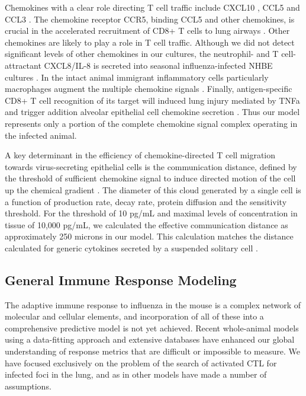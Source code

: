 \documentclass[10pt]{article}
\begin{document}
Chemokines with a clear role directing T cell traffic include CXCL10 \cite{Dufour2002}, CCL5 \cite{Kawai1999} and CCL3 \cite{Kawai1999}.  The chemokine receptor CCR5, binding CCL5 and other chemokines, is crucial in the accelerated recruitment of CD8+ T cells to lung airways \cite{Kohlmeier2008}.  Other chemokines are likely to play a role in T cell traffic.  Although we did not detect significant levels of other chemokines in our cultures, the neutrophil- and T cell-attractant CXCL8/IL-8 is secreted into seasonal influenza-infected NHBE cultures \cite{Matsukura1996, Arndt2002}.  In the intact animal immigrant inflammatory cells particularly macrophages augment the multiple chemokine signals \cite{Julkunen2000}.  Finally, antigen-specific CD8+ T cell recognition of its target will induced lung injury mediated by TNFa and trigger addition alveolar epithelial cell chemokine secretion \cite{Zhao2000}.   Thus our model represents only a portion of the complete chemokine signal complex operating in the infected animal.

A key determinant in the efficiency of chemokine-directed T cell migration towards virus-secreting epithelial cells is the communication distance, defined by the threshold of sufficient chemokine signal to induce directed motion of the cell up the chemical gradient \cite{Thelen2008}.  The diameter of this cloud generated by a single cell is a function of production rate, decay rate, protein diffusion and the sensitivity threshold.  For the threshold of 10 pg/mL and maximal levels of concentration in tissue of 10,000 pg/mL, we calculated the effective communication distance as approximately 250 microns in our model.  This calculation matches the distance calculated for generic cytokines secreted by a suspended solitary cell \cite{Francis1997}.

\subsection*{General Immune Response Modeling}

The adaptive immune response to influenza in the mouse is a complex network of molecular and cellular elements, and incorporation of all of these into a comprehensive predictive model is not yet achieved.  Recent whole-animal models using a data-fitting approach and extensive databases have enhanced our global understanding of response metrics that are difficult or impossible to measure.  We have focused exclusively on the problem of the search of activated CTL for infected foci in the lung, and as in other models have made a number of assumptions.
\end{document}
